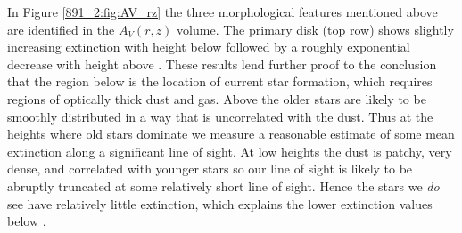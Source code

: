 In Figure \ref{891_2:fig:AV_rz} the three morphological features
mentioned above are identified in the $A_V(r,z)$ volume. The primary
disk (top row) shows slightly increasing extinction with height below
 followed by a roughly exponential decrease with
height above . These results lend further proof to
the conclusion that the region below  is the location of
current star formation, which requires regions of optically thick dust
and gas. Above  the older stars are likely to be
smoothly distributed in a way that is uncorrelated with the dust. Thus
at the heights where old stars dominate we measure a reasonable
estimate of some mean extinction along a significant line of sight. At
low heights the dust is patchy, very dense, and correlated with
younger stars so our line of sight is likely to be abruptly truncated
at some relatively short line of sight. Hence the stars we \emph{do}
see have relatively little extinction, which explains the lower
extinction values below .




